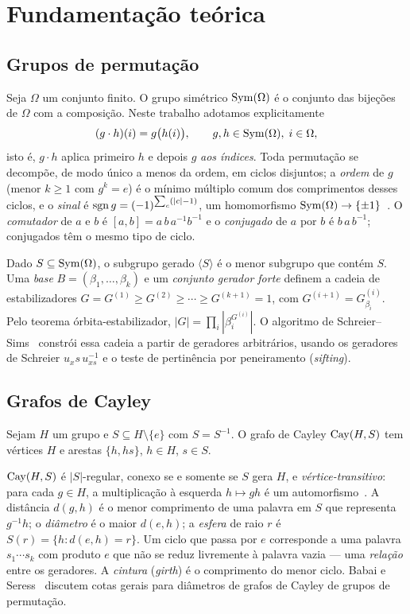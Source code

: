 \section{Fundamentação teórica}\label{sec:fundamentacao}

\subsection{Grupos de permutação}
Seja $\Omega$ um conjunto finito. O grupo simétrico $\operatorname{Sym}(\Omega)$ é o conjunto das bijeções de $\Omega$ com a composição. Neste trabalho adotamos explicitamente
\begin{equation}\label{eq:produto}
  (g\cdot h)(i) = g\bigl(h(i)\bigr), \qquad g,h\in\operatorname{Sym}(\Omega),\; i\in\Omega,
\end{equation}
isto é, $g\cdot h$ aplica primeiro $h$ e depois $g$ \emph{aos índices}. Toda permutação se decompõe, de modo único a menos da ordem, em ciclos disjuntos; a \emph{ordem} de $g$ (menor $k\ge1$ com $g^k=e$) é o mínimo múltiplo comum dos comprimentos desses ciclos, e o \emph{sinal} é $\operatorname{sgn} g = (-1)^{\sum_c (|c|-1)}$, um homomorfismo $\operatorname{Sym}(\Omega)\to\{\pm1\}$~\cite{joyner2008}. O \emph{comutador} de $a$ e $b$ é $[a,b]=a\,b\,a^{-1}b^{-1}$ e o \emph{conjugado} de $a$ por $b$ é $b\,a\,b^{-1}$; conjugados têm o mesmo tipo de ciclo\lit.

Dado $S\subseteq\operatorname{Sym}(\Omega)$, o subgrupo gerado $\langle S\rangle$ é o menor subgrupo que contém $S$. Uma \emph{base} $B=(\beta_1,\dots,\beta_k)$ e um \emph{conjunto gerador forte} definem a cadeia de estabilizadores $G=G^{(1)}\ge G^{(2)}\ge\cdots\ge G^{(k+1)}=1$, com $G^{(i+1)}=G^{(i)}_{\beta_i}$. Pelo teorema órbita-estabilizador, $|G|=\prod_i |\beta_i^{G^{(i)}}|$. O algoritmo de Schreier--Sims~\cite{sims1970,seress2003,holt2005} constrói essa cadeia a partir de geradores arbitrários, usando os geradores de Schreier $u_x s\, u_{xs}^{-1}$ e o teste de pertinência por peneiramento (\textit{sifting}).

\subsection{Grafos de Cayley}
\begin{definition}
Sejam $H$ um grupo e $S\subseteq H\setminus\{e\}$ com $S=S^{-1}$. O grafo de Cayley $\operatorname{Cay}(H,S)$ tem vértices $H$ e arestas $\{h, h s\}$, $h\in H$, $s\in S$.
\end{definition}
\noindent $\operatorname{Cay}(H,S)$ é $|S|$-regular, conexo se e somente se $S$ gera $H$, e \emph{vértice-transitivo}: para cada $g\in H$, a multiplicação à esquerda $h\mapsto gh$ é um automorfismo~\cite{godsil2001}\lit. A distância $d(g,h)$ é o menor comprimento de uma palavra em $S$ que representa $g^{-1}h$; o \emph{diâmetro} é o maior $d(e,h)$; a \emph{esfera} de raio $r$ é $S(r)=\{h: d(e,h)=r\}$. Um ciclo que passa por $e$ corresponde a uma palavra $s_1\cdots s_k$ com produto $e$ que não se reduz livremente à palavra vazia --- uma \emph{relação} entre os geradores. A \emph{cintura} (\textit{girth}) é o comprimento do menor ciclo. Babai e Seress~\cite{babai1992} discutem cotas gerais para diâmetros de grafos de Cayley de grupos de permutação.

